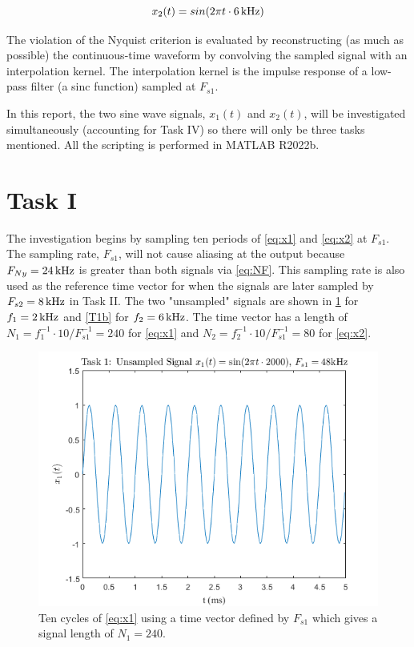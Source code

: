 \documentclass[a4paper,12pt]{article}
\newcommand{\Hz}[1]{%
    \ifcase#1
        \relax
    \or
        \,\text{Hz}
    \or
        \,\text{kHz}
    \or
        \,\text{MHz}
    \or
        \,\text{GHz}
    \else
        \,\text{Invalid}
    \fi
}
\begin{document}
\begin{equation}
    x_2(t) = sin(2 \pi t \cdot 6\Hz{2}) 
    \label{eq:x2}
\end{equation}

The violation of the Nyquist criterion is evaluated by reconstructing (as much as possible) the continuous-time waveform by convolving the sampled signal with an interpolation kernel. The interpolation kernel is the impulse response of a low-pass filter (a sinc function) sampled at $F_{s1}$. 

In this report, the two sine wave signals, $x_1(t)$ and $x_2(t)$, will be investigated simultaneously (accounting for Task IV) so there will only be three tasks mentioned. All the scripting is performed in MATLAB R2022b.



\clearpage
\section*{Task I}
The investigation begins by sampling ten periods of \cref{eq:x1} and \cref{eq:x2} at $F_{s1}$. The sampling rate, $F_{s1}$, will not cause aliasing at the output because $F_{Ny}=24\Hz{2}$ is greater than both signals via \cref{eq:NF}. This sampling rate is also used as the reference time vector for when the signals are later sampled by $F_{s2}=8\Hz{2}$ in Task II. The two "unsampled" signals are shown in \cref{T1a} for $f_1=2\Hz{2}$ and \cref{T1b} for $f_2=6\Hz{2}$. The time vector has a length of $N_1 = f_1^{-1} \cdot 10 / F_{s1}^{-1} = 240$ for \cref{eq:x1} and $N_2 = f_2^{-1} \cdot 10 / F_{s1}^{-1} = 80$ for \cref{eq:x2}.

\begin{figure}[!h]
    \centering
    \includegraphics[width=1\textwidth]{T1a.png}
    \captionsetup{justification=centering}
    \caption{\small Ten cycles of \cref{eq:x1} using a time vector defined by $F_{s1}$ which gives a signal length of $N_1 = 240$.}
    \label{T1a}
\end{figure}
\end{document}
